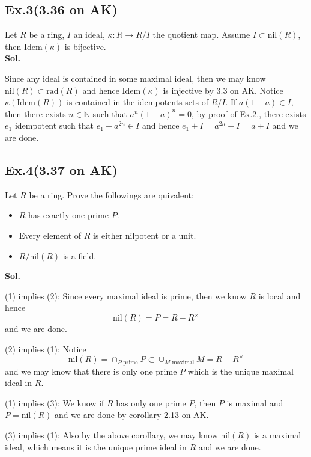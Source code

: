 \documentclass[lang=en,11pt,a4paper,citestyle =authoryear]{elegantpaper}
\begin{document}
\subsection*{Ex.3(3.36 on AK)} 
Let $R$ be a ring, $I$ an ideal, $\kappa:R\to R/I$ the quotient map. Assume $I\subset \text{nil}(R)$, then $\text{Idem}(\kappa)$ is bijective.
\vspace{0.5em}\\
\textbf{Sol.} \par
Since any ideal is contained in some maximal ideal, then we may know $\text{nil}(R) \subset \text{rad}(R)$ and hence $\text{Idem}(\kappa)$ is injective by 3.3 on AK. Notice $\kappa(\text{Idem}(R))$ is contained in the idempotents sets of $R/I$. If $a(1-a) \in I$, then there exists $n\in\mathbb{N}$ such that $a^n(1-a)^n = 0$, by proof of Ex.2., there exists $e_1$ idempotent such that $e_1 - a^{2n} \in I$ and hence $e_1+I = a^{2n}+I = a+I$ and we are done.
\par 
\vspace{0.5em}

\subsection*{Ex.4(3.37 on AK)} 
Let $R$ be a ring. Prove the followings are quivalent:
\begin{itemize}
    \item $R$ has exactly one prime $P$.
    \item Every element of $R$ is either nilpotent or a unit.
    \item $R/\text{nil}(R)$ is a field.
\end{itemize}
\vspace{0.5em}
\textbf{Sol.} \par
(1) implies (2): Since every maximal ideal is prime, then we know $R$ is local and hence
\[
\text{nil}(R) = P  = R-R^{\times}
\]
and we are done.\par
(2) implies (1): Notice
\[
\text{nil}(R) = \cap_{P\text{ prime}}P \subset \cup_{M\text{ maximal}}M = R-R^{\times}
\]
and we may know that there is only one prime $P$ which is the unique maximal ideal in $R$.\par
(1) implies (3): We know if $R$ has only one prime $P$, then $P$ is maximal and $P = \text{nil}(R)$ and we are done by corollary 2.13 on AK.\par
(3) implies (1): Also by the above corollary, we may know $\text{nil}(R)$ is a maximal ideal, which means it is the unique prime ideal in $R$ and we are done.
\par 
\vspace{0.5em}
\end{document}
